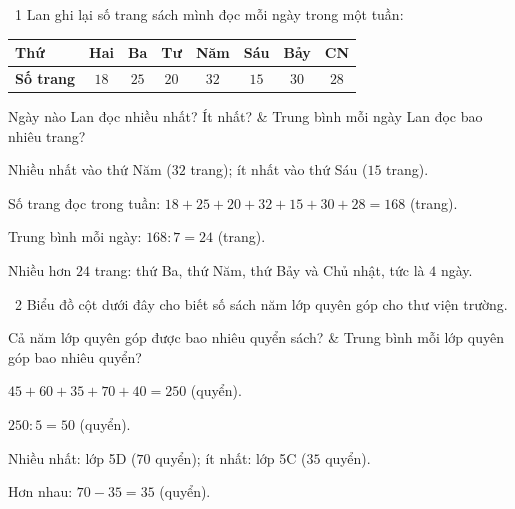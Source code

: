 \begin{exbox}{\ExWord\ 1}
Lan ghi lại số trang sách mình đọc mỗi ngày trong một tuần:
\begin{center}
\begin{tabular}{|l|c|c|c|c|c|c|c|}
\hline
\textbf{Thứ} & Hai & Ba & Tư & Năm & Sáu & Bảy & CN\\\hline
\textbf{Số trang} & $18$ & $25$ & $20$ & $32$ & $15$ & $30$ & $28$\\\hline
\end{tabular}
\end{center}
\begin{cols2}
 Ngày nào Lan đọc nhiều nhất? Ít nhất? &  Trung bình mỗi ngày Lan đọc bao nhiêu trang?\\
\end{cols2}
\guide
{} Nhiều nhất vào thứ Năm ($32$ trang); ít nhất vào thứ Sáu ($15$ trang).\par
{} Số trang đọc trong tuần: $18+25+20+32+15+30+28=168$ (trang).\par Trung bình mỗi ngày: $168:7=24$ (trang).\par
{} Nhiều hơn $24$ trang: thứ Ba, thứ Năm, thứ Bảy và Chủ nhật, tức là $4$ ngày.
\end{exbox}
\gap
\begin{exbox}{\ExWord\ 2}
Biểu đồ cột dưới đây cho biết số sách năm lớp quyên góp cho thư viện trường.
\begin{center}
\end{center}
\begin{cols2}
 Cả năm lớp quyên góp được bao nhiêu quyển sách? &  Trung bình mỗi lớp quyên góp bao nhiêu quyển?\\
\end{cols2}
\guide
{} $45+60+35+70+40=250$ (quyển).\par
{} $250:5=50$ (quyển).\par
{} Nhiều nhất: lớp 5D ($70$ quyển); ít nhất: lớp 5C ($35$ quyển).\par Hơn nhau: $70-35=35$ (quyển).
\end{exbox}
\gap
